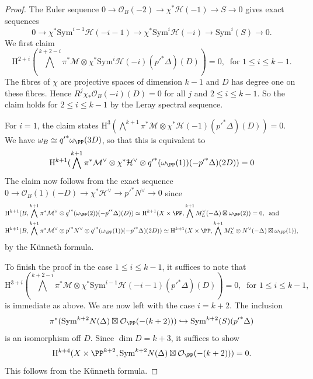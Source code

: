\begin{proof}
The Euler sequence $0 \to \mathcal{O}_B(-2) \to \chi^* \mathcal{H} (-1)  \to S \to 0$
gives exact sequences
$$0 \to \chi^* \mathrm{Sym}^{i-1} \mathcal{H} (-i-1) \to \chi^*\mathrm{Sym}^{i} \mathcal{H} (-i) \to \mathrm{Sym}^i(S) \to 0.$$
 We first claim
  $$\mathrm{H}^{2+i}(\bigwedge^{k+2-i} \pi^* \mathcal{M} \otimes \chi^*\mathrm{Sym}^{i} \mathcal{H} (-i)({p'}^*\Delta)(D))=0, \; \; \text{for $1 \leq i \leq k-1$}.$$
 The fibres of $\chi$ are projective spaces of dimension $k-1$ and $D$ has degree one on these fibres. Hence $R^j \chi_*\mathcal{O}_B(-i)(D)=0$ for all $j$ and $2 \leq i \leq k-1$. So the claim holds for $2 \leq i \leq k-1$ by the Leray spectral sequence.

 For $i=1$, the claim states $\mathrm{H}^3(\bigwedge^{k+1} \pi^* \mathcal{M} \otimes \chi^*\mathcal{H} (-1)({p'}^*\Delta)(D))=0$. We have $\omega_B \simeq {q'}^* \omega_{\PP}(3D)$, so that this is equivalent to
$$\mathrm{H}^{k+1}(\bigwedge^{k+1} \pi^* \mathcal{M}^{\vee} \otimes \chi^*\mathcal{H}^{\vee}\otimes {q'}^*(\omega_{\PP}(1)) (-{p'}^*\Delta)(2D))=0$$
The claim now follows from the exact sequence $ 0 \to \mathcal{O}_{B}(1)(-D) \to \chi^* \mathcal{H}^{\vee} \to {p'}^*N^{\vee} \to 0$ since
{\small{\begin{align*}
&\mathrm{H}^{k+1}(B, \bigwedge^{k+1} \pi^* \mathcal{M}^{\vee} \otimes {q'}^*(\omega_{\PP}(2)) (-{p'}^*\Delta)(D)) \simeq \mathrm{H}^{k+1}(X\times \PP, \bigwedge^{k+1} M_L^{\vee}(-\Delta)\boxtimes \omega_{\PP}(2))=0, \; \; \text{and} \\
&\mathrm{H}^{k+1}(B,\bigwedge^{k+1} \pi^* \mathcal{M}^{\vee} \otimes {p'}^*N^{\vee} \otimes {q'}^*(\omega_{\PP}(1)) (-{p'}^*\Delta)(2D))  \simeq \mathrm{H}^{k+1}(X \times \PP, \bigwedge^{k+1} M_L^{\vee}\otimes N^{\vee}(-\Delta) \boxtimes \omega_{\PP}(1)),
\end{align*}}}
by the K\"unneth formula.


To finish the proof in the case $1 \leq i \leq k-1$,  it suffices to note that
 $$\mathrm{H}^{3+i}(\bigwedge^{k+2-i} \pi^* \mathcal{M} \otimes \chi^*\mathrm{Sym}^{i-1} \mathcal{H} (-i-1)({p'}^*\Delta)(D))=0, \; \; \text{for $1 \leq i \leq k-1$},$$ is immediate as above. We are now left with the case $i=k+2$. The inclusion $$\pi^*( \mathrm{Sym}^{k+2}N(\Delta) \boxtimes \mathcal{O}_{\PP}(-(k+2))) \hookrightarrow \mathrm{Sym}^{k+2}(S)({p'}^*\Delta)$$ is an isomorphism off $D$. Since $\dim D=k+3$, it suffices to show $$\mathrm{H}^{k+4}(X \times \PP^{k+2}, \mathrm{Sym}^{k+2}N(\Delta) \boxtimes \mathcal{O}_{\PP}(-(k+2)))=0.$$ This follows from the K\"unneth formula. \end{proof}

